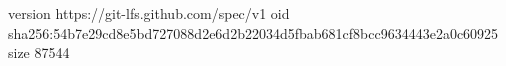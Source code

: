 version https://git-lfs.github.com/spec/v1
oid sha256:54b7e29cd8e5bd727088d2e6d2b22034d5fbab681cf8bcc9634443e2a0c60925
size 87544

